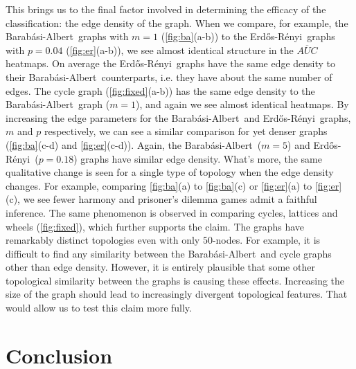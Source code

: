 \documentclass[letterpaper]{article}
\newcommand{\BA}{Barab\'{a}si-Albert~}
\newcommand{\BAbox}{\mbox{\BA}}
\newcommand{\ER}{Erd\H{o}s-R\'{e}nyi~}
\newcommand{\ERbox}{\mbox{\ER}}
\begin{document}
This brings us to the final factor involved in determining the efficacy of the classification: the edge density of the graph. When we compare, for example, the \BAbox graphs with $m=1$ (\cref{fig:ba}(a-b)) to the \ERbox graphs with $p=0.04$ (\cref{fig:er}(a-b)), we see almost identical structure in the $\overline{AUC}$ heatmaps. On average the \ERbox graphs have the same edge density to their \BAbox counterparts, i.e. they have about the same number of edges. The cycle graph (\cref{fig:fixed}(a-b)) has the same edge density to the \BAbox graph (\mbox{$m=1$}), and again we see almost identical heatmaps. By increasing the edge parameters for the \BAbox and \ERbox graphs, $m$ and $p$ respectively, we can see a similar comparison for yet denser graphs (\mbox{\cref{fig:ba}(c-d)} and \mbox{\cref{fig:er}(c-d)}). Again, the \BAbox ($m=5$) and \ERbox ($p=0.18$) graphs have similar edge density. What's more, the same qualitative change is seen for a single type of topology when the edge density changes. For example, comparing \cref{fig:ba}(a) to \ref{fig:ba}(c) or \cref{fig:er}(a) to \ref{fig:er}(c), we see fewer harmony and prisoner's dilemma games admit a faithful inference. The same phenomenon is observed in comparing cycles, lattices and wheels (\cref{fig:fixed}), which further supports the claim. The graphs have remarkably distinct topologies even with only $50$-nodes. For example, it is difficult to find any similarity between the \BAbox and cycle graphs other than edge density. However, it is entirely plausible that some other topological similarity between the graphs is causing these effects. Increasing the size of the graph should lead to increasingly divergent topological features. That would allow us to test this claim more fully.

\section{Conclusion}\label{sec:conclusion}
\end{document}
